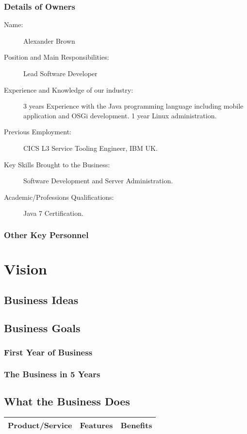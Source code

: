 \documentclass[DIV=calc, paper=a4, fontsize=11pt]{scrartcl}	 %
\begin{document}
\subsubsection*{Details of Owners}
\begin{description}
\item[Name:] Alexander Brown
\item[Position and Main Responsibilities:] Lead Software Developer
\item[Experience and Knowledge of our industry:] 3 years Experience with the Java programming 
language including mobile application and OSGi development. 1 year Linux administration. %
\item[Previous Employment:] CICS L3 Service Tooling Engineer, IBM UK.
\item[Key Skills Brought to the Business:] Software Development and Server Administration.
\item[Academic/Professions Qualifications:] Java 7 Certification.
\end{description}

\subsubsection*{Other Key Personnel}


\section{Vision}

\subsection{Business Ideas}

\subsection{Business Goals}
\subsubsection*{First Year of Business}
\subsubsection*{The Business in 5 Years}

\subsection{What the Business Does}
\begin{tabular}{|l|l|l|}\hline
Product/Service & Features & Benefits \\ \hline
\end{tabular}
\end{document}
